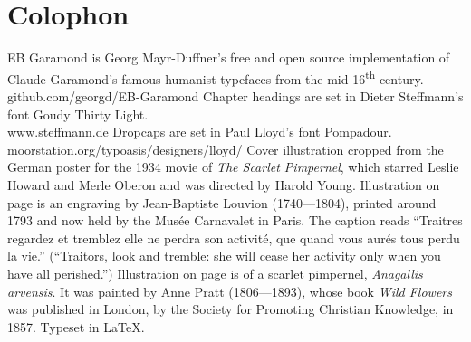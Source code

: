 \documentclass[
paper=a5,
BCOR=7mm,
twoside,
DIV=calc,
12pt,
usegeometry,
chapterprefix,
endperiod,
headings=big]{scrbook}
\begin{document}
\chapter*{Colophon}

\centering
EB Garamond is Georg Mayr-Duffner's free and open source implementation of Claude Garamond's famous humanist typefaces from the mid-16\textsuperscript{th} century. \\github.com/georgd/EB-Garamond
\vfill
Chapter headings are set in Dieter Steffmann's font Goudy Thirty Light.\\www.steffmann.de
\vfill
Dropcaps are set in Paul Lloyd's font Pompadour.\\moorstation.org/typoasis/designers/lloyd/
\vfill
Cover illustration cropped from the German poster for the 1934 movie of \textit{The Scarlet Pimpernel}, which starred Leslie Howard and Merle Oberon and was directed by Harold Young.
\vfill
Illustration on page \pageref{guillotine} is an engraving by Jean-Baptiste Louvion (1740---1804), printed around 1793 and now held by the Musée Carnavalet in Paris. The caption reads \enquote{Traitres regardez et tremblez elle ne perdra son activité, que quand vous aurés tous perdu la vie.} (\enquote{Traitors, look and tremble: she will cease her activity only when you have all perished.})
\vfill
Illustration on page \pageref{flowers} is of a scarlet pimpernel, \textit{Anagallis arvensis}. It was painted by Anne Pratt (1806---1893), whose book \textit{Wild Flowers} was published in London, by the Society for Promoting Christian Knowledge, in 1857. 
\vfill
Typeset in \LaTeX{}.
\thispagestyle{empty}
\end{document}
